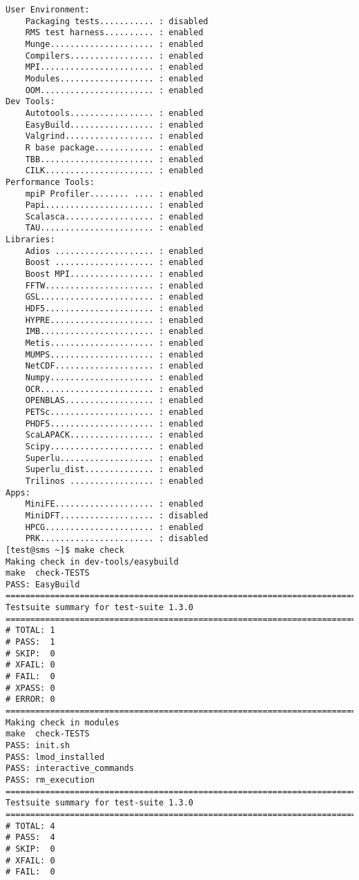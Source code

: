 \begin{lstlisting}
User Environment:
    Packaging tests........... : disabled
    RMS test harness.......... : enabled
    Munge..................... : enabled
    Compilers................. : enabled
    MPI....................... : enabled
    Modules................... : enabled
    OOM....................... : enabled
Dev Tools:
    Autotools................. : enabled
    EasyBuild................. : enabled
    Valgrind.................. : enabled
    R base package............ : enabled
    TBB....................... : enabled
    CILK...................... : enabled
Performance Tools:
    mpiP Profiler........ .... : enabled
    Papi...................... : enabled
    Scalasca.................. : enabled
    TAU....................... : enabled
Libraries:
    Adios .................... : enabled
    Boost .................... : enabled
    Boost MPI................. : enabled
    FFTW...................... : enabled
    GSL....................... : enabled
    HDF5...................... : enabled
    HYPRE..................... : enabled
    IMB....................... : enabled
    Metis..................... : enabled
    MUMPS..................... : enabled
    NetCDF.................... : enabled
    Numpy..................... : enabled
    OCR....................... : enabled
    OPENBLAS.................. : enabled
    PETSc..................... : enabled
    PHDF5..................... : enabled
    ScaLAPACK................. : enabled
    Scipy..................... : enabled
    Superlu................... : enabled
    Superlu_dist.............. : enabled
    Trilinos ................. : enabled
Apps:
    MiniFE.................... : enabled
    MiniDFT................... : disabled
    HPCG...................... : enabled
    PRK....................... : disabled
[test@sms ~]$ make check
Making check in dev-tools/easybuild
make  check-TESTS
PASS: EasyBuild
============================================================================
Testsuite summary for test-suite 1.3.0
============================================================================
# TOTAL: 1
# PASS:  1
# SKIP:  0
# XFAIL: 0
# FAIL:  0
# XPASS: 0
# ERROR: 0
============================================================================
Making check in modules
make  check-TESTS
PASS: init.sh
PASS: lmod_installed
PASS: interactive_commands
PASS: rm_execution
============================================================================
Testsuite summary for test-suite 1.3.0
============================================================================
# TOTAL: 4
# PASS:  4
# SKIP:  0
# XFAIL: 0
# FAIL:  0

\end{lstlisting}

